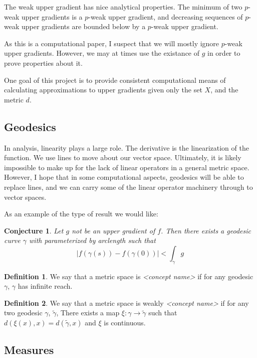\documentclass{article}
\theoremstyle{definition}
\theoremstyle{definition}
\newtheorem*{defn}{Definition}
\theoremstyle{plain}
\newtheorem{conj}[thm]{Conjecture}
\renewcommand{\(}{\left(}
\renewcommand{\)}{\right)}
\begin{document}
The weak upper gradient has nice analytical properties.  The minimum of two $p$-weak upper gradients is a $p$-weak upper gradient, and decreasing sequences of $p$-weak upper gradients are bounded below by a $p$-weak upper gradient.

As this is a computational paper, I suspect that we will mostly ignore $p$-weak upper gradients.  However, we may at times use the existance of $g$ in order to prove properties about it.

One goal of this project is to provide consistent computational means of calculating approximations to upper gradients given only the set $X$, and the metric $d$.

\subsection*{Geodesics}
In analysis, linearity plays a large role.  The derivative is the linearization of the function.  We use lines to move about our vector space.  Ultimately, it is likely impossible to make up for the lack of linear operators in a general metric space.  However, I hope that in some computational aspects, geodesics will be able to replace lines, and we can carry some of the linear operator machinery through to vector spaces.

As an example of the type of result we would like:
\begin{conj}
Let $g$ not be an upper gradient of $f$.  Then there exists a geodesic curve $\gamma$ with parameterized by arclength such that
$$ \left\vert f(\gamma(s)) - f(\gamma(0)) \right\vert < \int_\gamma g $$
\end{conj}

\begin{defn}
  We say that a metric space is \emph{<concept name>} %
  if for any geodesic $\gamma$, $\gamma$ has infinite reach.
\end{defn}

\begin{defn}
  We say that a metric space is weakly \emph{<concept name>} %
  if for any two geodesic $\gamma$, $\tilde \gamma$, There exists a map $\xi : \gamma \rightarrow \tilde \gamma$ such that $d(\xi(x), x) = d(\tilde \gamma,x)$ and $\xi$ is continuous.

\end{defn}

\subsection*{Measures}
\end{document}
